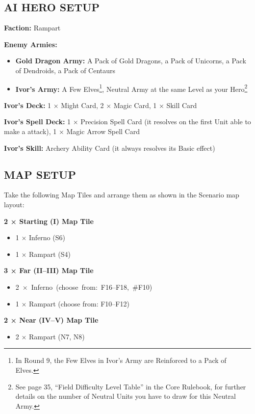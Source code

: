 \begin{multicols*}{2}
\subsection*{\MakeUppercase{AI Hero Setup}}

\textbf{Faction:} Rampart

\textbf{Enemy Armies:}

\begin{itemize}
  \item \textbf{Gold Dragon Army:} A Pack of Gold Dragons, a Pack of Unicorns, a Pack of Dendroids, a Pack of Centaurs
  \item \textbf{Ivor's Army:} A Few Elves\footnote{In Round 9, the Few Elves in Ivor's Army are Reinforced to a Pack of Elves.}, Neutral Army at the same Level as your Hero\footnote{See page 35, ``Field Difficulty Level Table'' in the Core Rulebook, for further details on the number of Neutral Units you have to draw for this Neutral Army.}
\end{itemize}

\textbf{Ivor's Deck:} 1 × Might Card, 2 × Magic Card, 1 × Skill Card

\textbf{Ivor's Spell Deck:} 1 × Precision Spell Card (it resolves on the first  Unit able to make a  attack), 1 × Magic Arrow Spell Card

\textbf{Ivor's Skill:} Archery Ability Card (it always resolves its Basic effect)

\subsection*{\MakeUppercase{Map Setup}}

Take the following Map Tiles and arrange them as shown in the Scenario map layout:

\textbf{2 × Starting (I) Map Tile}
\begin{itemize}
  \item 1 × Inferno (S6)
  \item 1 × Rampart (S4)
\end{itemize}

\textbf{3 × Far (II--III) Map Tile}
\begin{itemize}
  \item \mbox{2 × Inferno (choose from: F16--F18, \#F10)}
  \item 1 × Rampart (choose from: F10--F12)
\end{itemize}

\textbf{2 × Near (IV--V) Map Tile}
\begin{itemize}
  \item 2 × Rampart (N7, N8)
\end{itemize}


\end{multicols*}
